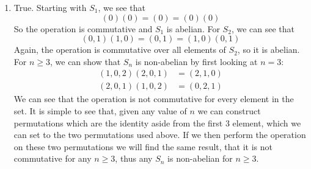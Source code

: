 \documentclass[12pt]{article}
\numberwithin{equation}{section}
\numberwithin{figure}{section}
\begin{document}
\begin{enumerate}
\begin{enumerate}
            \item True. Starting with $S_1$, we see that 
            \begin{equation*}
                (0)(0)=(0)=(0)(0)
            \end{equation*}
            So the operation is commutative and $S_1$ is abelian. For $S_2$, we can see that 
            \begin{equation*}
                (0,1)(1,0)=(0,1)=(1,0)(0,1)
            \end{equation*}
            Again, the operation is commutative over all elements of $S_2$, so it is abelian. For $n\geq 3$, we can show that $S_n$ is non-abelian by first looking 
            at $n=3$:
            \begin{align*}
                (1,0,2)(2,0,1)&=(2,1,0)\\
                (2,0,1)(1,0,2)&=(0,2,1)
            \end{align*}
            We can see that the operation is not commutative for every element in the set. It is simple to see that, given any value of $n$ we can construct 
            permutations which are the identity aside from the first 3 element, which we can set to the two permutations used above. If we then perform the operation 
            on these two permutations we will find the same result, that it is not commutative for any $n\geq 3$, thus any $S_n$ is non-abelian for $n\geq 3$.
        \end{enumerate}
    \end{enumerate}
\end{document}
